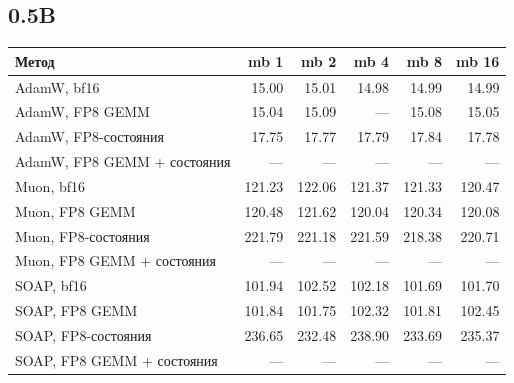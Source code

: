 \documentclass[10pt]{article}
\begin{document}
\subsection{0.5B}
\begin{center}
\small
\begin{tabular}{lrrrrr}
\toprule
\textbf{Метод} & \textbf{mb 1} & \textbf{mb 2} & \textbf{mb 4} & \textbf{mb 8} & \textbf{mb 16} \\
\midrule
AdamW, bf16 & 15.00 & 15.01 & 14.98 & 14.99 & 14.99 \\
AdamW, FP8 GEMM & 15.04 & 15.09 & --- & 15.08 & 15.05 \\
AdamW, FP8-состояния & 17.75 & 17.77 & 17.79 & 17.84 & 17.78 \\
AdamW, FP8 GEMM + состояния & --- & --- & --- & --- & --- \\
Muon, bf16 & 121.23 & 122.06 & 121.37 & 121.33 & 120.47 \\
Muon, FP8 GEMM & 120.48 & 121.62 & 120.04 & 120.34 & 120.08 \\
Muon, FP8-состояния & 221.79 & 221.18 & 221.59 & 218.38 & 220.71 \\
Muon, FP8 GEMM + состояния & --- & --- & --- & --- & --- \\
SOAP, bf16 & 101.94 & 102.52 & 102.18 & 101.69 & 101.70 \\
SOAP, FP8 GEMM & 101.84 & 101.75 & 102.32 & 101.81 & 102.45 \\
SOAP, FP8-состояния & 236.65 & 232.48 & 238.90 & 233.69 & 235.37 \\
SOAP, FP8 GEMM + состояния & --- & --- & --- & --- & --- \\
\bottomrule
\end{tabular}
\end{center}
\end{document}
